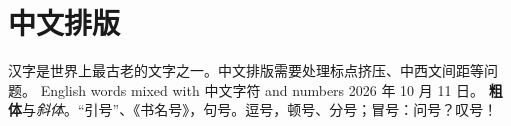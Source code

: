 \documentclass{article}
\begin{document}
\section{中文排版}
汉字是世界上最古老的文字之一。中文排版需要处理标点挤压、中西文间距等问题。
English words mixed with 中文字符 and numbers 2026 年 10 月 11 日。
\textbf{粗体}与\textit{斜体}。“引号”、《书名号》，句号。逗号，顿号、分号；冒号：问号？叹号！
\end{document}

